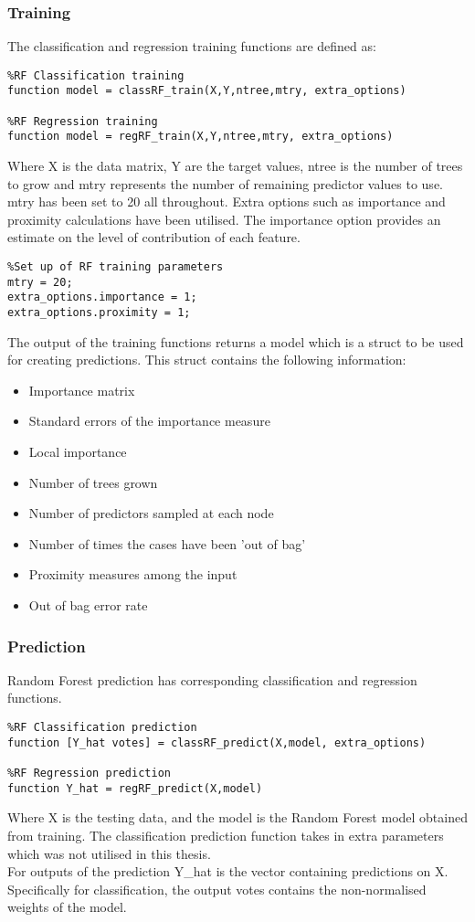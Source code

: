 \subsubsection{Training}
\label{sect:rf_training}
The classification and regression training functions are defined as:
\begin{lstlisting}
%RF Classification training
function model = classRF_train(X,Y,ntree,mtry, extra_options)

%RF Regression training
function model = regRF_train(X,Y,ntree,mtry, extra_options)
\end{lstlisting}
\medskip
Where X is the data matrix, Y are the target values, ntree is the number of trees to grow and mtry represents the number of remaining predictor values to use. mtry has been set to 20 all throughout. Extra options such as importance and proximity calculations have been utilised. The importance option provides an estimate on the level of contribution of each feature.
\begin{lstlisting}
%Set up of RF training parameters
mtry = 20;
extra_options.importance = 1;
extra_options.proximity = 1;
\end{lstlisting}
The output of the training functions returns a model which is a struct to be used for creating predictions. This struct contains the following information:
\begin{itemize}
	\item Importance matrix
	\item Standard errors of the importance measure
	\item Local importance
	\item Number of trees grown
	\item Number of predictors sampled at each node
	\item Number of times the cases have been 'out of bag'
	\item Proximity measures among the input
	\item Out of bag error rate
\end{itemize}

\subsubsection{Prediction}
\label{sect:rf_testing}
Random Forest prediction has corresponding classification and regression functions. 
\begin{lstlisting}
%RF Classification prediction
function [Y_hat votes] = classRF_predict(X,model, extra_options)

%RF Regression prediction
function Y_hat = regRF_predict(X,model)
\end{lstlisting}
\medskip
Where X is the testing data, and the model is the Random Forest model obtained from training. The classification prediction function takes in extra parameters which was not utilised in this thesis.
\\[1\baselineskip]
For outputs of the prediction Y\_hat is the vector containing predictions on X. Specifically for classification, the output votes contains the non-normalised weights of the model.

